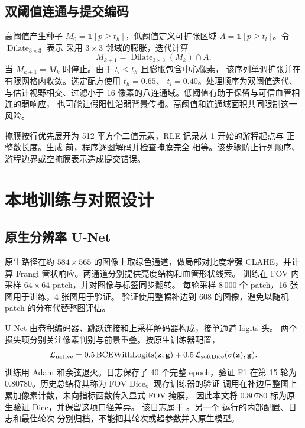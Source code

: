 \subsection{双阈值连通与提交编码}
高阈值产生种子 $M_0=\mathbf 1[p\ge t_h]$，低阈值定义可扩张区域
$A=\mathbf 1[p\ge t_l]$。令 $\operatorname{Dilate}_{3\times3}$ 表示
采用 $3\times3$ 邻域的膨胀，迭代计算
\[
M_{k+1}=\operatorname{Dilate}_{3\times3}(M_k)\cap A .
\]
当 $M_{k+1}=M_k$ 时停止。由于 $t_l\le t_h$ 且膨胀包含中心像素，
该序列单调扩张并在有限网格内收敛。选定配方使用 $t_h=0.65$、
$t_l=0.40$。处理顺序为双阈值迭代、与估计视野相交、过滤小于
16 像素的八连通域。低阈值有助于保留与可信血管相连的弱响应，
也可能让假阳性沿弱背景传播。高阈值和连通域面积共同限制这一风险。

掩膜按行优先展开为 512 平方个二值元素，RLE 记录从 1 开始的游程起点与
正整数长度。生成  前，程序逐图解码并检查掩膜完全
相等。该步骤防止行列顺序、游程边界或空掩膜表示造成提交错误。

\section{本地训练与对照设计}
\label{sec:native-train}
\subsection{原生分辨率 U-Net}
原生路径在约 $584\times565$ 的图像上取绿色通道，做局部对比度增强
CLAHE，并计算 Frangi 管状响应。两通道分别提供亮度结构和血管形状线索。
训练在 FOV 内采样 $64\times64$ patch，并对图像与标签同步翻转。
每轮采样 8\,000 个 patch，16 张图用于训练，4 张图用于验证。
验证使用整幅补边到 608 的图像，避免以随机 patch 的分布代替整图评估。

U-Net 由卷积编码器、跳跃连接和上采样解码器构成，接单通道 logits 头。
两个损失项分别关注像素判别与前景重叠。按原生训练器配置，
\[
\mathcal L_{\rm native}
 =0.5\,\mathrm{BCEWithLogits}(\mathbf z,\mathbf g)
 +0.5\,\mathcal L_{\rm softDice}(\sigma(\mathbf z),\mathbf g).
\]
训练用 Adam 和余弦退火。日志保存了 40 个完整 epoch，验证 F1
在第 15 轮为 0.80780。历史总结将其称为 FOV Dice。现存训练器的验证
调用在补边后整图上累加像素计数，未向指标函数传入显式 FOV 掩膜，
因此本文将 0.80780 标为原生验证 Dice，并保留这项口径差异。
该日志属于 。另一个
 运行的内部配置、日志和最佳轮次
分别归档，不能把其轮次或超参数并入原生模型。

